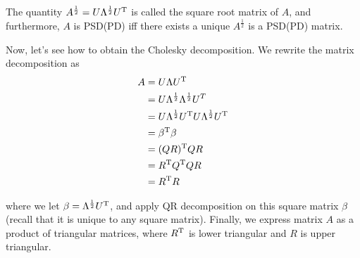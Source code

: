 The quantity $A^{\frac{1}{2}} = U\Lambda^{\frac{1}{2}}U^{{\rm T}}$ is called the square root matrix of $A$, and furthermore, $A$ is PSD(PD) iff there exists a unique $A^{\frac{1}{2}}$ is a PSD(PD) matrix.

Now, let's see how to obtain the Cholesky decomposition. We rewrite the matrix decomposition as
\begin{align*}
A &= U\Lambda U^{{\rm T}} \\
&=U\Lambda^{\frac{1}{2}}\Lambda^{\frac{1}{2}}U^{T}\\
&= U\Lambda^{\frac{1}{2}}U^{{\rm T}}U\Lambda^{\frac{1}{2}}U^{{\rm T}}\\
&=\beta^{{\rm T}}\beta\\
&=(QR)^{{\rm T}}QR\\
&=R^{{\rm T}}Q^{{\rm T}}QR\\
&=R^{{\rm T}}R
\end{align*}

where we let $\beta=\Lambda^{\frac{1}{2}}U^{{\rm T}}$, and apply QR decomposition on this square matrix $\beta$(recall that it is unique to any square matrix). Finally, we express matrix $A$ as a product of triangular matrices, where $R^{{\rm T}}$ is lower triangular and $R$ is upper triangular.



